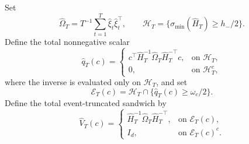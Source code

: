 Set
\[
 \widehat\Omega_T=T^{-1}\sum_{t=1}^T\widehat\xi_t\widehat\xi_t^\top,
 \qquad
 \mathcal H_T=\{\sigma_{\min}(\widehat H_T)\ge h_-/2\}.
\]
Define the total nonnegative scalar
\[
 \widehat q_T(c)=
 \begin{cases}
 c^\top\widehat H_T^{-1}\widehat\Omega_T\widehat H_T^{-\top}c,
   &\text{on }\mathcal H_T,\\
 0,&\text{on }\mathcal H_T^c,
 \end{cases}
\]
where the inverse is evaluated only on \(\mathcal H_T\), and set
\[
 \mathcal E_T(c)=\mathcal H_T\cap\{\widehat q_T(c)\ge\omega_c/2\}.
\]
Define the total event-truncated sandwich by
\[
 \widehat V_T(c)=
 \begin{cases}
 \widehat H_T^{-1}\widehat\Omega_T\widehat H_T^{-\top},
   &\text{on }\mathcal E_T(c),\\
 I_d,&\text{on }\mathcal E_T(c)^c.
 \end{cases}
\]